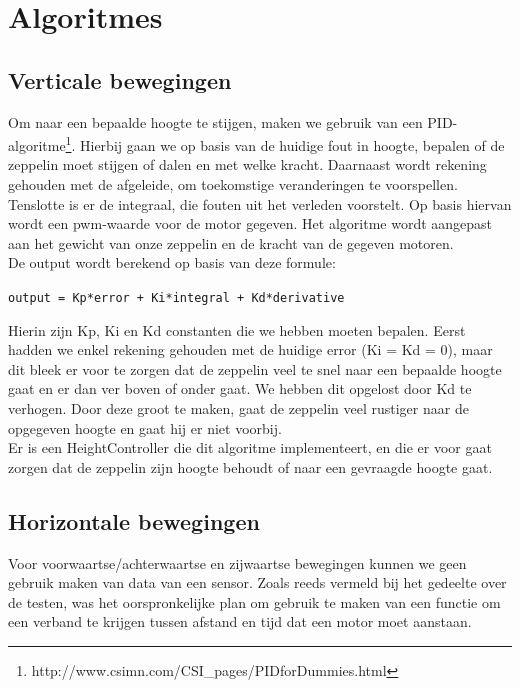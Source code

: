 \documentclass[eind]{penoverslag}
\begin{document}
\section{Algoritmes}
\subsection{Verticale bewegingen}
Om naar een bepaalde hoogte te stijgen, maken we gebruik van een PID-algoritme\footnote{http://www.csimn.com/CSI\_pages/PIDforDummies.html}. Hierbij gaan we op basis van de huidige fout in hoogte, bepalen of de zeppelin moet stijgen of dalen en met welke kracht. Daarnaast wordt rekening gehouden met de afgeleide, om toekomstige veranderingen te voorspellen. Tenslotte is er de integraal, die fouten uit het verleden voorstelt. Op basis hiervan wordt een pwm-waarde voor de motor gegeven. Het algoritme wordt aangepast aan het gewicht van onze zeppelin en de kracht van de gegeven motoren. \\
De output wordt berekend op basis van deze formule: 

\begin{center}
\texttt{output = Kp*error + Ki*integral + Kd*derivative}\\
\end{center}

Hierin zijn Kp, Ki en Kd constanten die we hebben moeten bepalen. Eerst hadden we enkel rekening gehouden met de huidige error (Ki = Kd = 0), maar dit bleek er voor te zorgen dat de zeppelin veel te snel naar een bepaalde hoogte gaat en er dan ver boven of onder gaat. We hebben dit opgelost door Kd te verhogen. Door deze groot te maken, gaat de zeppelin veel rustiger naar de opgegeven hoogte en gaat hij er niet voorbij. \\

Er is een HeightController die dit algoritme implementeert, en die er voor gaat zorgen dat de zeppelin zijn hoogte behoudt of naar een gevraagde hoogte gaat.

\subsection{Horizontale bewegingen}
Voor voorwaartse/achterwaartse en zijwaartse bewegingen kunnen we geen gebruik maken van data van een sensor. Zoals reeds vermeld bij het gedeelte over de testen, was het oorspronkelijke plan om gebruik te maken van een functie om een verband te krijgen tussen afstand en tijd dat een motor moet aanstaan. \\
\end{document}
